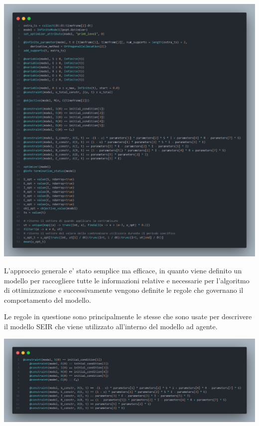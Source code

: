 \begin{minipage}{\linewidth}
	\centering
	\includegraphics[width=\textwidth]{img/controller_ipopt.png}
	\label{fig:controller_ipopt}
\end{minipage}

L'approccio generale e' stato semplice ma efficace, in quanto viene definito un modello 
per raccogliere tutte le informazioni relative e necessarie per l'algoritmo di ottimizzazione
e successivamente vengono definite le regole che governano il comportamento del modello. 

Le regole in questione sono principalmente le stesse che sono usate per descrivere il modello SEIR
che viene utilizzato all'interno del modello ad agente.

\begin{minipage}{\linewidth}
	\centering
	\includegraphics[width=\textwidth]{img/controller_rules.png}
	\label{fig:controller_rules}
\end{minipage}

